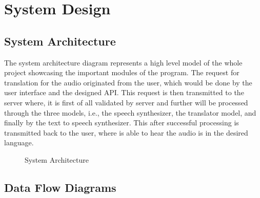 \newpage
\chapter{System Design}
\clearpage
\section{System Architecture}
{\normalsize{The system architecture diagram represents a high level model of the whole project showcasing the important modules of the program. The request for translation for the audio originated from the user, which would be done by the user interface and the designed API. This request is then transmitted to the server where, it is first of all validated by server and further will be processed through the three models, i.e., the speech synthesizer, the translator model, and finally by the text to speech synthesizer. This after successful processing is transmitted back to the user, where is able to hear the audio is in the desired language.}}


\begin{figure}[h]
  \begin{center}
  \caption{System Architecture}
  \end{center}
\end{figure}

\vspace*{0.2cm}
\newpage

\clearpage
\section{Data Flow Diagrams}
